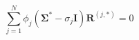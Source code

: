 \begin{equation}
        \sum_{j = 1}^N \phi_j \left(\boldsymbol{\Sigma^*} - \sigma_j \mathbf{I}\right)\mathbf{R}^{(j,*)} = 0
\label{eq:effective_medium_theory}
\end{equation}
